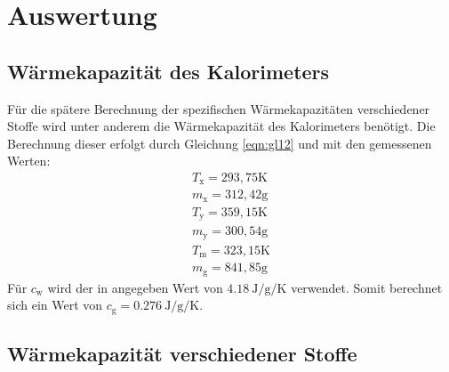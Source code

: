 \section{Auswertung}
\label{sec:Auswertung}

\subsection{Wärmekapazität des Kalorimeters}
\label{sec:Kalorie}
Für die spätere Berechnung der spezifischen Wärmekapazitäten verschiedener Stoffe wird unter anderem die Wärmekapazität des Kalorimeters benötigt.
Die Berechnung dieser erfolgt durch Gleichung \eqref{eqn:gl12} und mit den gemessenen Werten:
\begin{align*}
 T_\text{x} = 293,75 \text{K}\\
 m_\text{x} = 312,42 \text{g}\\
 T_\text{y} = 359,15 \text{K}\\
 m_\text{y} = 300,54 \text{g}\\
 T_\text{m} = 323,15 \text{K}\\
 m_\text{g} = 841,85 \text{g}
\end{align*}
Für $c_\text{w}$ wird der in \cite{V201} angegeben Wert von $\SI{4,18}{\joule\per\gram\per\kelvin}$ verwendet.
Somit berechnet sich ein Wert von $ c_\text{g} = \SI{0,276}{\joule\per\gram\per\kelvin}.$

\subsection{Wärmekapazität verschiedener Stoffe}
\label{sec:verschiedeneStoffe}

